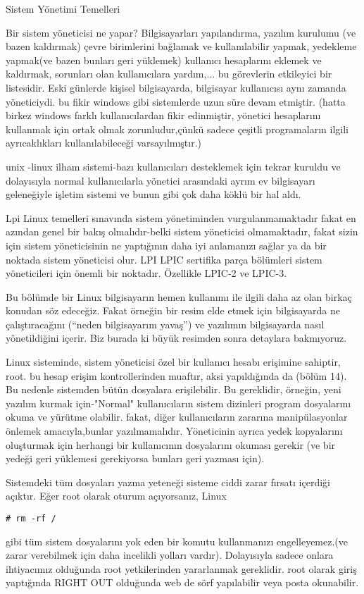 \begin{section}{Sistem Yönetimi Temelleri}

Bir sistem yöneticisi ne yapar? Bilgisayarları yapılandırma, yazılım kurulumu (ve bazen kaldırmak) çevre birimlerini bağlamak ve kullanılabilir yapmak, yedekleme yapmak(ve bazen bunları geri yüklemek) kullanıcı hesaplarını eklemek ve kaldırmak, sorunları olan kullanıcılara yardım,... bu görevlerin etkileyici bir listesidir. Eski günlerde kişisel bilgisayarda, bilgisayar kullanıcısı aynı zamanda yöneticiydi. bu fikir windows gibi sistemlerde uzun süre devam etmiştir. (hatta birkez windows farklı kullanıcılardan fikir edinmiştir, yönetici hesaplarını kullanmak için ortak olmak zorunludur,çünkü sadece çeşitli programaların ilgili ayrıcaklıkları kullanılabileceği varsayılmıştır.)

unix -linux ilham sistemi-bazı kullanıcıları desteklemek için tekrar kuruldu ve dolayısıyla normal kullanıcılarla yönetici arasındaki ayrım ev bilgisayarı geleneğiyle işletim sistemi ve bunun gibi çok daha köklü bir hal aldı.

Lpi Linux temelleri sınavında sistem yönetiminden vurgulanmamaktadır fakat en azından genel bir bakış olmalıdır-belki sistem yöneticisi olmamaktadır, fakat sizin için sistem yöneticisinin ne yaptığının daha iyi anlamanızı sağlar ya da bir noktada sistem yöneticisi olur. LPI LPIC sertifika parça bölümleri sistem yöneticileri için önemli bir noktadır. Özellikle LPIC-2 ve LPIC-3. 

Bu bölümde bir Linux bilgisayarın  hemen kullanımı ile ilgili daha az olan birkaç konudan söz edeceğiz. Fakat  örneğin bir resim  elde etmek için bilgisayarda ne çalıştıracağını (“neden  bilgisayarım yavaş”)  ve yazılımın bilgisayarda nasıl yönetildiğini içerir. Biz burada ki büyük resimden sonra detaylara bakmıyoruz.  

Linux sisteminde, sistem yöneticisi özel bir kullanıcı hesabı erişimine sahiptir, root. bu hesap erişim kontrollerinden muaftır, aksi yapıldığında da (bölüm 14). Bu nedenle sistemden  bütün dosyalara erişilebilir. Bu gereklidir, örneğin, yeni yazılım kurmak için-"Normal" kullanıcıların sistem dizinleri program dosyalarını okuma ve yürütme olabilir. fakat, diğer kullanıcıların zararına manipülasyonlar önlemek amacıyla,bunlar yazılmamalıdır. Yöneticinin ayrıca yedek kopyalarını oluşturmak için herhangi bir kullanıcının dosyalarını okuması gerekir (ve bir yedeği geri yüklemesi gerekiyorsa bunları geri yazması için).

Sistemdeki tüm  dosyaları yazma yeteneği sisteme ciddi zarar fırsatı  içerdiği açıktır. Eğer root olarak oturum açıyorsanız, Linux
\begin{verbatim}
# rm -rf /
\end{verbatim}
gibi  tüm sistem dosyalarını yok eden bir komutu kullanmanızı engelleyemez.(ve zarar verebilmek için daha incelikli yolları vardır). Dolayısıyla sadece onlara ihtiyacımız olduğunda root yetkilerinden yararlanmak gereklidir. root  olarak giriş yaptığında  RIGHT OUT olduğunda web de sörf  yapılabilir veya posta okunabilir.


\end{section}
